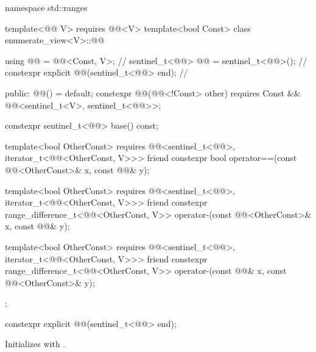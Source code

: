 %
\begin{codeblock}
namespace std::ranges {
  template<@@ V>
    requires @@<V>
  template<bool Const>
  class enumerate_view<V>::@@ {
    using @@ = @@<Const, V>;                         // \expos
    sentinel_t<@@> @@ = sentinel_t<@@>();                 // \expos
    constexpr explicit @@(sentinel_t<@@> end);          // \expos

  public:
    @@() = default;
    constexpr @@(@@<!Const> other)
      requires Const && @@<sentinel_t<V>, sentinel_t<@@>>;

    constexpr sentinel_t<@@> base() const;

    template<bool OtherConst>
      requires @@<sentinel_t<@@>, iterator_t<@@<OtherConst, V>>>
    friend constexpr bool operator==(const @@<OtherConst>& x, const @@& y);

    template<bool OtherConst>
      requires @@<sentinel_t<@@>, iterator_t<@@<OtherConst, V>>>
    friend constexpr range_difference_t<@@<OtherConst, V>>
      operator-(const @@<OtherConst>& x, const @@& y);

    template<bool OtherConst>
      requires @@<sentinel_t<@@>, iterator_t<@@<OtherConst, V>>>
    friend constexpr range_difference_t<@@<OtherConst, V>>
      operator-(const @@& x, const @@<OtherConst>& y);
  };
}
\end{codeblock}

%
\begin{itemdecl}
constexpr explicit @@(sentinel_t<@@> end);
\end{itemdecl}

\begin{itemdescr}
\pnum
\effects
Initializes  with .
\end{itemdescr}

